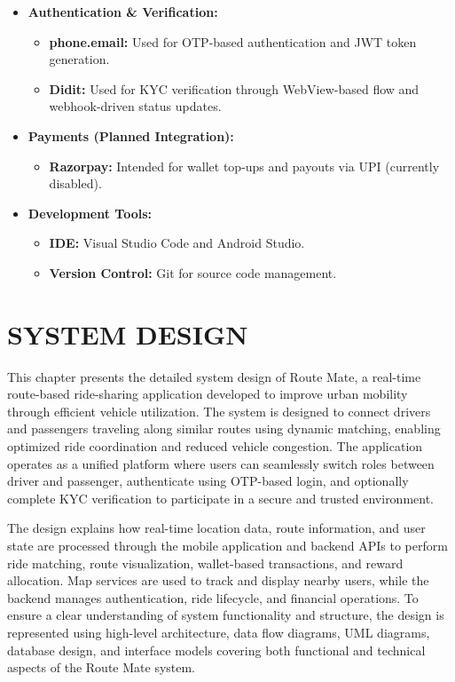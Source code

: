 \documentclass[10pt,a4paper]{report}
\begin{document}
\begin{itemize}
    \item \textbf{Authentication \& Verification:}
    \begin{itemize}
        \item \textbf{phone.email:} Used for OTP-based authentication and JWT token generation.
        \item \textbf{Didit:} Used for KYC verification through WebView-based flow and webhook-driven status updates.
    \end{itemize}

    \item \textbf{Payments (Planned Integration):}
    \begin{itemize}
        \item \textbf{Razorpay:} Intended for wallet top-ups and payouts via UPI (currently disabled).
    \end{itemize}

    \item \textbf{Development Tools:}
    \begin{itemize}
        \item \textbf{IDE:} Visual Studio Code and Android Studio.
        \item \textbf{Version Control:} Git for source code management.
    \end{itemize}
\end{itemize}



\newpage
\chapter{SYSTEM DESIGN}
\large\justify
This chapter presents the detailed system design of Route Mate, a real-time route-based ride-sharing application developed to improve urban mobility through efficient vehicle utilization. The system is designed to connect drivers and passengers traveling along similar routes using dynamic matching, enabling optimized ride coordination and reduced vehicle congestion. The application operates as a unified platform where users can seamlessly switch roles between driver and passenger, authenticate using OTP-based login, and optionally complete KYC verification to participate in a secure and trusted environment.

\large\justify
The design explains how real-time location data, route information, and user state are processed through the mobile application and backend APIs to perform ride matching, route visualization, wallet-based transactions, and reward allocation. Map services are used to track and display nearby users, while the backend manages authentication, ride lifecycle, and financial operations. To ensure a clear understanding of system functionality and structure, the design is represented using high-level architecture, data flow diagrams, UML diagrams, database design, and interface models covering both functional and technical aspects of the Route Mate system.
\end{document}
